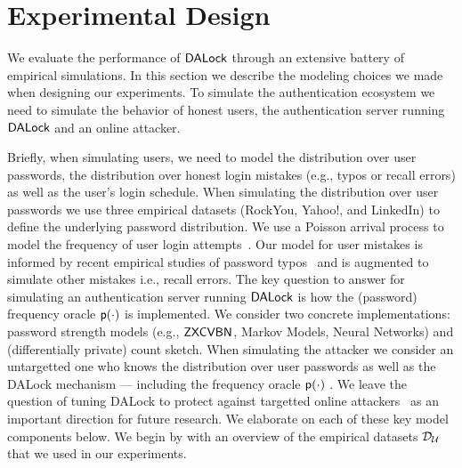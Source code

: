 
\section{Experimental Design} %
We evaluate the performance of $\mathsf{DALock}$ through an extensive battery of empirical simulations. In this section we describe the modeling choices we made when designing our experiments. To simulate the authentication ecosystem we need to simulate the behavior of honest users,  the authentication server running $\mathsf{DALock}$  and an online attacker. 

Briefly, when simulating users, we need to model the distribution over user passwords, the distribution over honest login mistakes (e.g., typos or recall errors) as well as the user's login schedule. When simulating the distribution over user passwords we use three empirical datasets (RockYou, Yahoo!, and LinkedIn) to define the underlying password distribution. We use a Poisson arrival process to model the frequency of user login attempts~\cite{AC:BloBluDat13}. Our model for user mistakes is informed by recent empirical studies of password typos~\cite{SP:CAAJR16,CCS:CWPCR17} and is augmented to simulate other mistakes i.e., recall errors.  The key question to answer for simulating an authentication server running $\mathsf{DALock}$ is how the (password) frequency oracle $\textsf{p}(\cdot)$ is implemented. We consider two concrete implementations: password strength models (e.g., $\mathsf{ZXCVBN}$, Markov Models, Neural Networks) and (differentially private) count sketch. When simulating the attacker we consider an untargetted one who knows the distribution over user passwords as well as the DALock mechanism --- including the frequency oracle $\textsf{p}(\cdot)$ . We leave the question of tuning DALock to protect against targetted online attackers~\cite{CCS:WZWYH16} as an important direction for future research. We elaborate on each of these key model components below.  We begin by with an overview of the empirical datasets $\mathcal{D}_{{\mathcal{U}}}$ that we used in our experiments.


